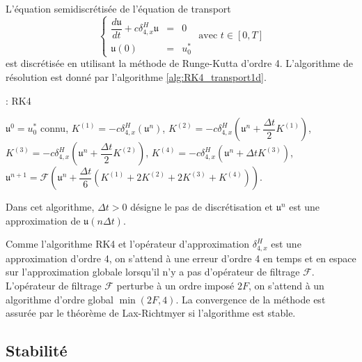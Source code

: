 L'équation semidiscrétisée de l'équation de transport
\begin{equation}
\left\lbrace
\begin{array}{rcl}
\dfrac{d \mathfrak{u}}{dt} + c \delta_{4,x}^H \mathfrak{u}& = &0 \\
\mathfrak{u}(0) & = & u_0^*
\end{array}
\text{ avec } t \in [0,T]
\right.
\end{equation}
est discrétisée en utilisant la méthode de Runge-Kutta d'ordre 4. L'algorithme de résolution est donné par l'algorithme \ref{alg:RK4_transport1d}.
\begin{center}
\begin{minipage}[H]{12cm}
  \begin{algorithm}[H]
    \caption{: RK4}\label{alg:RK4_transport1d}
    \begin{algorithmic}[1]
    \State $\mathfrak{u}^0 = u_0^*$ connu,
             \State  $K^{(1)} = - c \delta_{4,x}^H \left( \mathfrak{u}^n \right)$,
             \State  $K^{(2)} = - c \delta_{4,x}^H \left( \mathfrak{u}^n + \dfrac{\Delta t}{2} K^{(1)}\right)$,
             \State  $K^{(3)} = - c \delta_{4,x}^H \left( \mathfrak{u}^n + \dfrac{\Delta t}{2} K^{(2)}\right)$,
             \State  $K^{(4)} = - c \delta_{4,x}^H \left( \mathfrak{u}^n + \Delta t K^{(3)}\right)$,  
             \State  $\mathfrak{u}^{n+1} = \mathcal{F}\left( \mathfrak{u}^n  + \dfrac{\Delta t}{6} \left( K^{(1)} + 2 K^{(2)} + 2 K^{(3)} + K^{(4)} \right) \right)$.
            \EndFor
    \end{algorithmic}
    \end{algorithm}
\end{minipage}
\end{center}
Dans cet algorithme, $\Delta t > 0$ désigne le pas de discrétisation et $\mathfrak{u}^n$ est une approximation de $\mathfrak{u}(n \Delta t)$.

Comme l'algorithme RK4 et l'opérateur d'approximation $\delta_{4,x}^H$ est une approximation d'ordre 4, on s'attend à une erreur d'ordre 4 en temps et en espace sur l'approximation globale lorsqu'il n'y a pas d'opérateur de filtrage $\mathcal{F}$. L'opérateur de filtrage $\mathcal{F}$ perturbe à un ordre imposé $2F$, on s'attend à un algorithme d'ordre global $\min(2F,4)$.
La convergence de la méthode est assurée par le théorème de Lax-Richtmyer \cite{Lax1956} si l'algorithme est stable.




\subsection{Stabilité}

